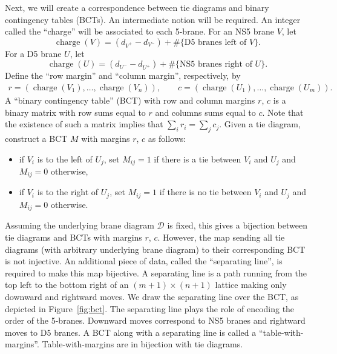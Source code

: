 \documentclass[pdftex]{sigma}
\numberwithin{equation}{section}
\newcommand{\brane}{\mathcal D}
\DeclareMathOperator{\charge}{charge}
\begin{document}
Next, we will create a correspondence between tie diagrams and binary contingency tables (BCTs). An intermediate notion will be required. An integer called the ``charge'' will be associated to each 5-brane.
For an NS5 brane $V$, let
\[
\charge(V)=
(d_{V^+}-d_{V^-})+\#\{\text{D5 branes left of $V$}\}.
\]
For a D5 brane $U$, let
\[
\charge(U)=
(d_{U^-}-d_{U^+})+\#\{\text{NS5 branes right of $U$}\}.
\]
Define the ``row margin'' and ``column margin'', respectively, by
\begin{align*}
r = (\charge(V_1), \dots , \charge(V_n)), \qquad
c = (\charge(U_1), \dots , \charge(U_m)).
\end{align*}
A ``binary contingency table'' (BCT) with row and column margins $r$, $c$ is a binary matrix with row sums equal to $r$ and columns sums equal to $c$. Note that the existence of such a matrix implies that $\sum_i r_i = \sum_j c_j$. Given a tie diagram, construct a BCT $M$ with margins $r$, $c$ as follows:
\begin{itemize}\itemsep=0pt
\item if $V_i$ is to the left of $U_j$, set $M_{ij} = 1$ if there is a tie between $V_i$ and $U_j$ and $M_{ij} = 0$ otherwise,
\item if $V_i$ is to the right of $U_j$, set $M_{ij} = 1$ if there is no tie between $V_i$ and $U_j$ and $M_{ij} = 0$ otherwise.
\end{itemize}
Assuming the underlying brane diagram $\brane$ is fixed, this gives a bijection between tie diagrams and BCTs with margins $r$, $c$. However, the map sending all tie diagrams (with arbitrary underlying brane diagram) to their corresponding BCT is not injective. An additional piece of data, called the ``separating line'', is required to make this map bijective. A separating line is a path running from the top left to the bottom right of an $(m + 1) \times (n + 1)$ lattice making only downward and rightward moves. We draw the separating line over the BCT, as depicted in Figure~\ref{fig:bct}. The separating line plays the role of encoding the order of the 5-branes. Downward moves correspond to NS5 branes and rightward moves to D5 branes. A BCT along with a separating line is called a ``table-with-margins''. Table-with-margins are in bijection with tie diagrams.
\end{document}
